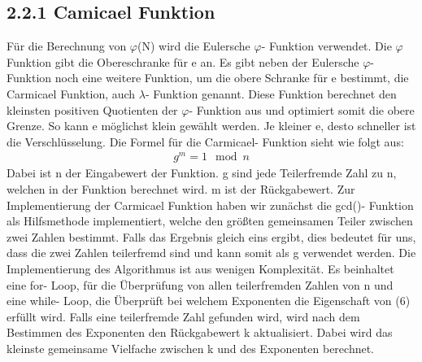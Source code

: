 \documentclass[course=asp]{aspdoc}
\begin{document}
\subsection*{2.2.1 Camicael Funktion} 
Für die Berechnung von $\varphi $(N) wird die Eulersche $\varphi $- Funktion verwendet. Die $\varphi $ Funktion gibt die Obereschranke für e an. Es gibt neben der Eulersche $\varphi $- Funktion noch eine weitere Funktion, um die obere Schranke für e bestimmt, die Carmicael Funktion, auch $\lambda $- Funktion genannt. Diese Funktion berechnet den kleinsten positiven Quotienten der $\varphi $- Funktion aus und optimiert somit die obere Grenze. So kann e möglichst klein gewählt werden. Je kleiner e, desto schneller ist die Verschlüsselung. Die Formel für die Carmicael- Funktion sieht wie folgt aus:
\begin{align}
	g^m = 1 \mod n
\end{align} 
Dabei ist n der Eingabewert der Funktion. g sind jede Teilerfremde Zahl zu n, welchen in der Funktion berechnet wird. m ist der Rückgabewert. Zur Implementierung der Carmicael Funktion haben wir zunächst die gcd()- Funktion als Hilfsmethode implementiert, welche den größten gemeinsamen Teiler zwischen zwei Zahlen bestimmt. Falls das Ergebnis gleich eins ergibt, dies bedeutet für uns, dass die zwei Zahlen teilerfremd sind und kann somit als g verwendet werden. Die Implementierung des Algorithmus ist aus wenigen Komplexität. Es beinhaltet eine for- Loop, für die Überprüfung von allen teilerfremden Zahlen von n und eine while- Loop, die Überprüft bei welchem Exponenten die Eigenschaft von (6) erfüllt wird. Falls eine teilerfremde Zahl gefunden wird, wird nach dem Bestimmen des Exponenten den Rückgabewert k aktualisiert. Dabei wird das kleinste gemeinsame Vielfache zwischen k und des Exponenten berechnet.
\end{document}
